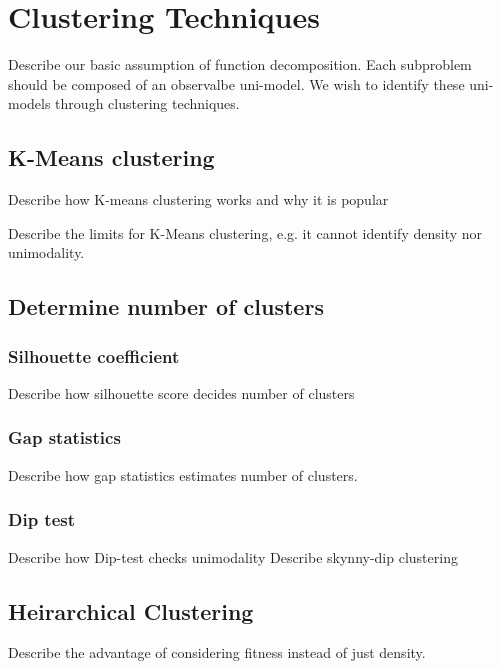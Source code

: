\chapter{Clustering Techniques}
\label{chapter:clustering}

Describe our basic assumption of function decomposition.
Each subproblem should be composed of an observalbe uni-model.
We wish to identify these uni-models through clustering techniques. 

\section{K-Means clustering}
Describe how K-means clustering works and why it is popular

Describe the limits for K-Means clustering, e.g. it cannot identify density nor unimodality. 

\section{Determine number of clusters}
\subsection{Silhouette coefficient}
Describe how silhouette score decides number of clusters 
\subsection{Gap statistics}
Describe how gap statistics estimates number of clusters.
\subsection{Dip test}
Describe how Dip-test checks unimodality
Describe skynny-dip clustering

\section{Heirarchical Clustering}
Describe the advantage of considering fitness instead of just density.


